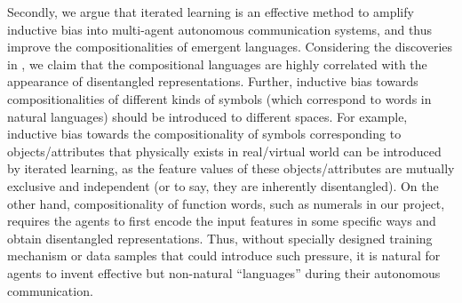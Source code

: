 Secondly, we argue that iterated learning is an effective method to amplify inductive bias into multi-agent autonomous communication systems, and thus improve the compositionalities of emergent languages. Considering the discoveries in \cite{locatello2018challenging}, we claim that the compositional languages are highly correlated with the appearance of disentangled representations. Further, inductive bias towards compositionalities of different kinds of symbols (which correspond to words in natural languages) should be introduced to different spaces. For example, inductive bias towards the compositionality of symbols corresponding to objects/attributes that physically exists in real/virtual world can be introduced by iterated learning, as the feature values of these objects/attributes are mutually exclusive and independent (or to say, they are inherently disentangled). On the other hand, compositionality of function words, such as numerals in our project, requires the agents to first encode the input features in some specific ways and obtain disentangled representations. Thus, without specially designed training mechanism or data samples that could introduce such pressure, it is natural for agents to invent effective but non-natural ``languages'' during their autonomous communication.
